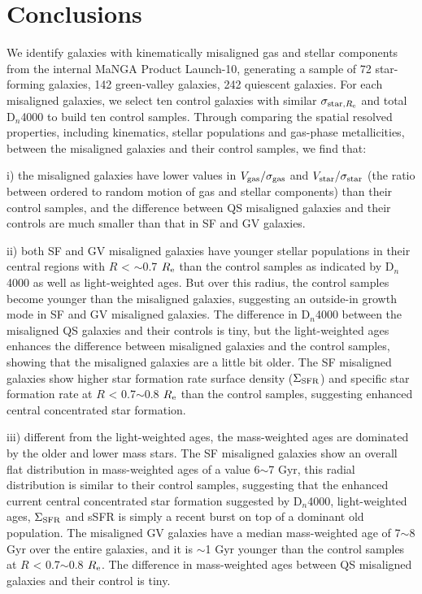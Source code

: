 \section{Conclusions}
\label{sec:conclusions}

We identify galaxies with kinematically misaligned gas and stellar components from the internal MaNGA Product Launch-10, generating a sample of 72 star-forming galaxies, 142 green-valley galaxies, 242 quiescent galaxies. For each misaligned galaxies, we select ten control galaxies with similar $\sigma_{{\rm star}, R_{\rm e}}$ and total D$_n$4000 to build ten control samples. Through comparing the spatial resolved properties, including kinematics, stellar populations and gas-phase metallicities, between the misaligned galaxies and their control samples, we find that:


i) the misaligned galaxies have lower values in $V_{\rm gas}/{\sigma}_{\rm gas}$ and $V_{\rm star}/{\sigma}_{\rm star}$ (the ratio between ordered to random motion of gas and stellar components) than their control samples, and the difference between QS misaligned galaxies and their controls are much smaller than that in SF and GV galaxies.

ii) both SF and GV misaligned galaxies have younger stellar populations in their central regions with $R$ < $\sim$0.7 $R_{\rm e}$ than the control samples as indicated by D$_n$4000 as well as light-weighted ages. But over this radius, the control samples become younger than the misaligned galaxies, suggesting an outside-in growth mode in SF and GV misaligned galaxies. The difference in D$_n$4000 between the misaligned QS galaxies and their controls is tiny, but the light-weighted ages enhances the difference between misaligned galaxies and the control samples, showing that the misaligned galaxies are a little bit older. The SF misaligned galaxies show higher star formation rate surface density ($\Sigma_{\rm SFR}$) and specific star formation rate at $R$ < 0.7$\sim$0.8 $R_{\rm e}$ than the control samples, suggesting enhanced central concentrated star formation.

iii) different from the light-weighted ages, the mass-weighted ages are dominated by the older and lower mass stars. The SF misaligned galaxies show an overall flat distribution in mass-weighted ages of a value 6$\sim$7 Gyr, this radial distribution is similar to their control samples, suggesting that the enhanced current central concentrated star formation suggested by D$_n$4000, light-weighted ages, $\Sigma_{\rm SFR}$ and sSFR is simply a recent burst on top of a dominant old population. The misaligned GV galaxies have a median mass-weighted age of 7$\sim$8 Gyr over the entire galaxies, and it is $\sim$1 Gyr younger than the control samples at $R$ < 0.7$\sim$0.8 $R_{\rm e}$. The difference in mass-weighted ages between QS misaligned galaxies and their control is tiny.

